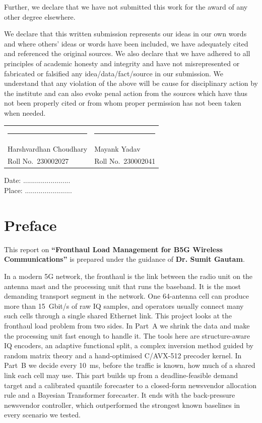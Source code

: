 \documentclass[12pt,a4paper,oneside]{report}
\newcommand{\btptitle}{Fronthaul Load Management for B5G Wireless Communications}
\newcommand{\studentA}{Harshvardhan Choudhary}
\newcommand{\rollA}{230002027}
\newcommand{\studentB}{Mayank Yadav}
\newcommand{\rollB}{230002041}
\newcommand{\guidename}{Dr. Sumit Gautam}
\theoremstyle{definition}
\begin{document}
Further, we declare that we have not submitted this work for the award of any other degree elsewhere.

We declare that this written submission represents our ideas in our own words and where others' ideas or words have been included, we have adequately cited and referenced the original sources. We also declare that we have adhered to all principles of academic honesty and integrity and have not misrepresented or fabricated or falsified any idea/data/fact/source in our submission. We understand that any violation of the above will be cause for disciplinary action by the institute and can also evoke penal action from the sources which have thus not been properly cited or from whom proper permission has not been taken when needed.

\vspace{2.5cm}
\noindent
\begin{tabular}{@{}p{}p{}@{}}
\rule{5cm}{0.4pt} & \rule{5cm}{0.4pt}\\
\studentA & \studentB\\
Roll No.\ \rollA & Roll No.\ \rollB
\end{tabular}

\vspace{1.5cm}
\noindent Date: ........................\\
Place: ........................

\chapter*{Preface}
This report on \textbf{``\btptitle''} is prepared under the guidance of \textbf{\guidename}.

In a modern 5G network, the fronthaul is the link between the radio unit on the antenna mast and the processing unit that runs the baseband. It is the most demanding transport segment in the network. One 64-antenna cell can produce more than 15~Gbit/s of raw IQ samples, and operators usually connect many such cells through a single shared Ethernet link. This project looks at the fronthaul load problem from two sides. In Part~A we shrink the data and make the processing unit fast enough to handle it. The tools here are structure-aware IQ encoders, an adaptive functional split, a complex inversion method guided by random matrix theory and a hand-optimised C/AVX-512 precoder kernel. In Part~B we decide every 10~ms, before the traffic is known, how much of a shared link each cell may use. This part builds up from a deadline-feasible demand target and a calibrated quantile forecaster to a closed-form newsvendor allocation rule and a Bayesian Transformer forecaster. It ends with the back-pressure newsvendor controller, which outperformed the strongest known baselines in every scenario we tested.
\end{document}
